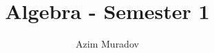 \documentclass[11pt,a4paper,titlepage]{article}
\title{Algebra - Semester 1}
\author{Azim Muradov}
\begin{document}
\maketitle
\blindtext
\end{document}
